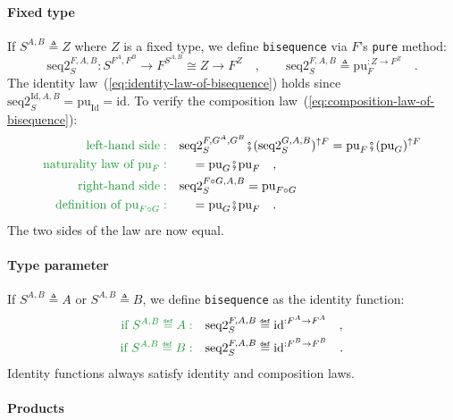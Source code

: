 \paragraph{Fixed type}

If $S^{A,B}\triangleq Z$ where $Z$ is a fixed type, we define \lstinline!bisequence!
via $F$\textsf{'}s \lstinline!pure! method:
\[
\text{seq2}_{S}^{F,A,B}:S^{F^{A},F^{B}}\rightarrow F^{S^{A,B}}\cong Z\rightarrow F^{Z}\quad,\quad\quad\text{seq2}_{S}^{F,A,B}\triangleq\text{pu}_{F}^{:Z\rightarrow F^{Z}}\quad.
\]
The identity law~(\ref{eq:identity-law-of-bisequence}) holds since
$\text{seq2}_{S}^{\text{Id},A,B}=\text{pu}_{\text{Id}}=\text{id}$.
To verify the composition law~(\ref{eq:composition-law-of-bisequence}):
\begin{align*}
{\color{greenunder}\text{left-hand side}:}\quad & \text{seq2}_{S}^{F,G^{A},G^{B}}\bef(\text{seq2}_{S}^{G,A,B})^{\uparrow F}=\text{pu}_{F}\bef(\text{pu}_{G})^{\uparrow F}\\
{\color{greenunder}\text{naturality law of }\text{pu}_{F}:}\quad & \quad=\text{pu}_{G}\bef\text{pu}_{F}\quad,\\
{\color{greenunder}\text{right-hand side}:}\quad & \text{seq2}_{S}^{F\circ G,A,B}=\text{pu}_{F\circ G}\\
{\color{greenunder}\text{definition of }\text{pu}_{F\circ G}:}\quad & \quad=\text{pu}_{G}\bef\text{pu}_{F}\quad.
\end{align*}
The two sides of the law are now equal.

\paragraph{Type parameter}

If $S^{A,B}\triangleq A$ or $S^{A,B}\triangleq B$, we define \lstinline!bisequence!
as the identity function:
\begin{align*}
{\color{greenunder}\text{if }S^{A,B}\triangleq A:}\quad & \text{seq2}_{S}^{F,A,B}\triangleq\text{id}^{:F^{A}\rightarrow F^{A}}\quad,\\
{\color{greenunder}\text{if }S^{A,B}\triangleq B:}\quad & \text{seq2}_{S}^{F,A,B}\triangleq\text{id}^{:F^{B}\rightarrow F^{B}}\quad.
\end{align*}
Identity functions always satisfy identity and composition laws.

\paragraph{Products}

